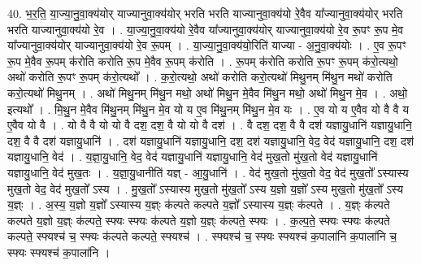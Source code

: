 \documentclass[17pt]{extarticle}
\begin{document}
40. भ॒र॒ति॒ या॒ज्या॒नु॒वा॒क्य॑योर् याज्यानुवा॒क्य॑योर् भरति भरति याज्यानुवा॒क्य॑यो रे॒वैव या᳚ज्यानुवा॒क्य॑योर् भरति भरति याज्यानुवा॒क्य॑यो रे॒व । . या॒ज्या॒नु॒वा॒क्य॑यो रे॒वैव या᳚ज्यानुवा॒क्य॑योर् याज्यानुवा॒क्य॑यो रे॒व रू॒पꣳ रू॒प मे॒व या᳚ज्यानुवा॒क्य॑योर् याज्यानुवा॒क्य॑यो रे॒व रू॒पम् । . या॒ज्या॒नु॒वा॒क्य॑यो॒रिति॑ याज्या - अ॒नु॒वा॒क्य॑योः । . ए॒व रू॒पꣳ रू॒प मे॒वैव रू॒पम् क॑रोति करोति रू॒प मे॒वैव रू॒पम् क॑रोति । . रू॒पम् क॑रोति करोति रू॒पꣳ रू॒पम् क॑रो॒त्यथो॒ अथो॑ करोति रू॒पꣳ रू॒पम् क॑रो॒त्यथो᳚ । . क॒रो॒त्यथो॒ अथो॑ करोति करो॒त्यथो॑ मिथु॒नम् मि॑थु॒न मथो॑ करोति करो॒त्यथो॑ मिथु॒नम् । . अथो॑ मिथु॒नम् मि॑थु॒न मथो॒ अथो॑ मिथु॒न मे॒वैव मि॑थु॒न मथो॒ अथो॑ मिथु॒न मे॒व । . अथो॒ इत्यथो᳚ । . मि॒थु॒न मे॒वैव मि॑थु॒नम् मि॑थु॒न मे॒व यो य ए॒व मि॑थु॒नम् मि॑थु॒न मे॒व यः । . ए॒व यो य ए॒वैव यो वै वै य ए॒वैव यो वै । . यो वै वै यो यो वै दश॒ दश॒ वै यो यो वै दश॑ । . वै दश॒ दश॒ वै वै दश॑ यज्ञायु॒धानि॑ यज्ञायु॒धानि॒ दश॒ वै वै दश॑ यज्ञायु॒धानि॑ । . दश॑ यज्ञायु॒धानि॑ यज्ञायु॒धानि॒ दश॒ दश॑ यज्ञायु॒धानि॒ वेद॒ वेद॑ यज्ञायु॒धानि॒ दश॒ दश॑ यज्ञायु॒धानि॒ वेद॑ । . य॒ज्ञा॒यु॒धानि॒ वेद॒ वेद॑ यज्ञायु॒धानि॑ यज्ञायु॒धानि॒ वेद॑ मुख॒तो मु॑ख॒तो वेद॑ यज्ञायु॒धानि॑ यज्ञायु॒धानि॒ वेद॑ मुख॒तः । . य॒ज्ञा॒यु॒धानीति॑ यज्ञ् - आ॒यु॒धानि॑ । . वेद॑ मुख॒तो मु॑ख॒तो वेद॒ वेद॑ मुख॒तो᳚ ऽस्यास्य मुख॒तो वेद॒ वेद॑ मुख॒तो᳚ ऽस्य । . मु॒ख॒तो᳚ ऽस्यास्य मुख॒तो मु॑ख॒तो᳚ ऽस्य य॒ज्ञो य॒ज्ञो᳚ ऽस्य मुख॒तो मु॑ख॒तो᳚ ऽस्य य॒ज्ञ्ः । . अ॒स्य॒ य॒ज्ञो य॒ज्ञो᳚ ऽस्यास्य य॒ज्ञ्ः क॑ल्पते कल्पते य॒ज्ञो᳚ ऽस्यास्य य॒ज्ञ्ः क॑ल्पते । . य॒ज्ञ्ः क॑ल्पते कल्पते य॒ज्ञो य॒ज्ञ्ः क॑ल्पते॒ स्फ्यः स्फ्यः क॑ल्पते य॒ज्ञो य॒ज्ञ्ः क॑ल्पते॒ स्फ्यः । . क॒ल्प॒ते॒ स्फ्यः स्फ्यः क॑ल्पते कल्पते॒ स्फ्यश्च॑ च॒ स्फ्यः क॑ल्पते कल्पते॒ स्फ्यश्च॑ । . स्फ्यश्च॑ च॒ स्फ्यः स्फ्यश्च॑ क॒पाला॑नि क॒पाला॑नि च॒ स्फ्यः स्फ्यश्च॑ क॒पाला॑नि । \newline
\pagebreak
{}
\end{document}

